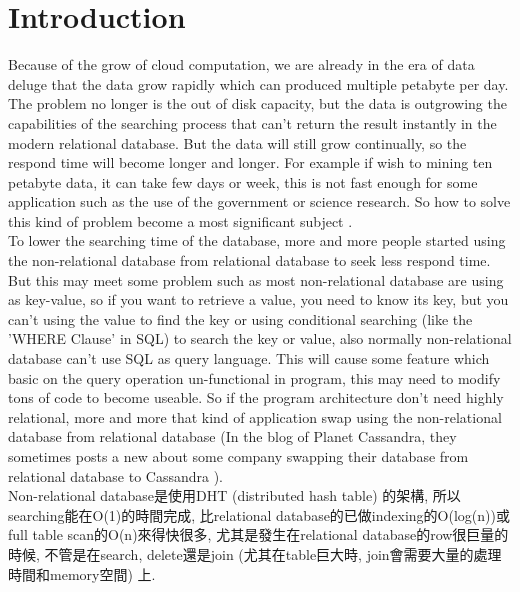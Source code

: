 \chapter{Introduction}
\label{chap:introduction}

\baselineskip=26pt
\thispagestyle{empty}

Because of the grow of cloud computation, we are already in the era of data deluge that the data grow rapidly which can produced multiple petabyte per day. The problem no longer is the out of disk capacity, but the data is outgrowing the capabilities of the searching process that can't return the result instantly in the modern relational database. But the data will still grow continually, so the respond time will become longer and longer. For example if wish to mining ten petabyte data, it can take few days or week, this is not fast enough for some application such as the use of the government or science research. So how to solve this kind of problem become a most significant subject \cite{paper:nodb}.\\

To lower the searching time of the database, more and more people started using the non-relational database from relational database to seek less respond time. But this may meet some problem such as most non-relational database are using as key-value, so if you want to retrieve a value, you need to know its key, but you can't using the value to find the key or using conditional searching (like the 'WHERE Clause' in SQL) to search the key or value, also normally non-relational database can't use SQL as query language. This will cause some feature which basic on the query operation un-functional in program, this may need to modify tons of code to become useable. So if the program architecture don't need highly relational, more and more that kind of application swap using the non-relational database from relational database (In the blog of Planet Cassandra, they sometimes posts a new about some company swapping their database from relational database to Cassandra \cite{web:planetcassandra-blog}).\\

Non-relational database是使用DHT (distributed hash table) \cite{web:wiki:distributed_hash_table}的架構, 所以searching能在O(1)的時間完成, 比relational database的已做indexing的O(log(n))或full table scan的O(n)來得快很多, 尤其是發生在relational database的row很巨量的時候, 不管是在search, delete還是join (尤其在table巨大時, join會需要大量的處理時間和memory空間) 上.\\

